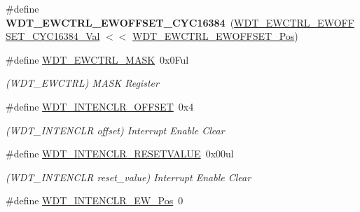 \begin{DoxyCompactItemize}
\item 
\hypertarget{group___s_a_m_l21___w_d_t_ga494871efe9afa4d5d50a1ee60d8c05cc}{}\#define {\bfseries W\+D\+T\+\_\+\+E\+W\+C\+T\+R\+L\+\_\+\+E\+W\+O\+F\+F\+S\+E\+T\+\_\+\+C\+Y\+C16384}~(\hyperlink{group___s_a_m_l21___w_d_t_ga901cf141d98d615ccc2103621f5a22b6}{W\+D\+T\+\_\+\+E\+W\+C\+T\+R\+L\+\_\+\+E\+W\+O\+F\+F\+S\+E\+T\+\_\+\+C\+Y\+C16384\+\_\+\+Val} $<$$<$ \hyperlink{group___s_a_m_l21___w_d_t_gabb7809711cdf296121c2108b55d3ad33}{W\+D\+T\+\_\+\+E\+W\+C\+T\+R\+L\+\_\+\+E\+W\+O\+F\+F\+S\+E\+T\+\_\+\+Pos})\label{group___s_a_m_l21___w_d_t_ga494871efe9afa4d5d50a1ee60d8c05cc}

\item 
\hypertarget{group___s_a_m_l21___w_d_t_gad11e24dd62ea0905ed507f49f62c55c2}{}\#define \hyperlink{group___s_a_m_l21___w_d_t_gad11e24dd62ea0905ed507f49f62c55c2}{W\+D\+T\+\_\+\+E\+W\+C\+T\+R\+L\+\_\+\+M\+A\+S\+K}~0x0\+Ful\label{group___s_a_m_l21___w_d_t_gad11e24dd62ea0905ed507f49f62c55c2}

\begin{DoxyCompactList}\small\item\em (W\+D\+T\+\_\+\+E\+W\+C\+T\+R\+L) M\+A\+S\+K Register \end{DoxyCompactList}\item 
\hypertarget{group___s_a_m_l21___w_d_t_ga98f37addcc6abfc015425013c3a39336}{}\#define \hyperlink{group___s_a_m_l21___w_d_t_ga98f37addcc6abfc015425013c3a39336}{W\+D\+T\+\_\+\+I\+N\+T\+E\+N\+C\+L\+R\+\_\+\+O\+F\+F\+S\+E\+T}~0x4\label{group___s_a_m_l21___w_d_t_ga98f37addcc6abfc015425013c3a39336}

\begin{DoxyCompactList}\small\item\em (W\+D\+T\+\_\+\+I\+N\+T\+E\+N\+C\+L\+R offset) Interrupt Enable Clear \end{DoxyCompactList}\item 
\hypertarget{group___s_a_m_l21___w_d_t_ga9e7f5a23ae81064086ecf4e877116ee0}{}\#define \hyperlink{group___s_a_m_l21___w_d_t_ga9e7f5a23ae81064086ecf4e877116ee0}{W\+D\+T\+\_\+\+I\+N\+T\+E\+N\+C\+L\+R\+\_\+\+R\+E\+S\+E\+T\+V\+A\+L\+U\+E}~0x00ul\label{group___s_a_m_l21___w_d_t_ga9e7f5a23ae81064086ecf4e877116ee0}

\begin{DoxyCompactList}\small\item\em (W\+D\+T\+\_\+\+I\+N\+T\+E\+N\+C\+L\+R reset\+\_\+value) Interrupt Enable Clear \end{DoxyCompactList}\item 
\hypertarget{group___s_a_m_l21___w_d_t_gacbfecace29fe0f43e6f3fb8799813157}{}\#define \hyperlink{group___s_a_m_l21___w_d_t_gacbfecace29fe0f43e6f3fb8799813157}{W\+D\+T\+\_\+\+I\+N\+T\+E\+N\+C\+L\+R\+\_\+\+E\+W\+\_\+\+Pos}~0\label{group___s_a_m_l21___w_d_t_gacbfecace29fe0f43e6f3fb8799813157}


\end{DoxyCompactItemize}
